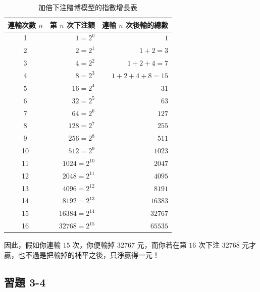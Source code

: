 \begin{table}[htbp]
\centering
\small
\renewcommand{\arraystretch}{1.2}
\begin{tabular}{|c|r|r|}
\hline
\textbf{連輸次數 $n$} & \textbf{第 $n$ 次下注額} & \textbf{連輸 $n$ 次後輸的總數} \\ \hline
1  & $1 = 2^0$      & $1$ \\ \hline
2  & $2 = 2^1$      & $1+2 = 3$ \\ \hline
3  & $4 = 2^2$      & $1+2+4 = 7$ \\ \hline
4  & $8 = 2^3$      & $1+2+4+8 = 15$ \\ \hline
5  & $16 = 2^4$     & $31$ \\ \hline
6  & $32 = 2^5$     & $63$ \\ \hline
7  & $64 = 2^6$     & $127$ \\ \hline
8  & $128 = 2^7$    & $255$ \\ \hline
9  & $256 = 2^8$    & $511$ \\ \hline
10 & $512 = 2^9$    & $1023$ \\ \hline
11 & $1024 = 2^{10}$ & $2047$ \\ \hline
12 & $2048 = 2^{11}$ & $4095$ \\ \hline
13 & $4096 = 2^{12}$ & $8191$ \\ \hline
14 & $8192 = 2^{13}$ & $16383$ \\ \hline
15 & $16384 = 2^{14}$ & $32767$ \\ \hline
16 & $32768 = 2^{15}$ & $65535$ \\ \hline
\end{tabular}
\caption{加倍下注賭博模型的指數增長表}\label{tab:gambler_ruin}
\end{table}

因此，假如你連輸 $15$ 次，你便輸掉 $32767$ 元，而你若在第 $16$ 次下注 $32768$ 元才贏，也不過是把輸掉的補平之後，只淨贏得一元！

\subsection*{習題 3-4}\label{sec:ex3-4}

